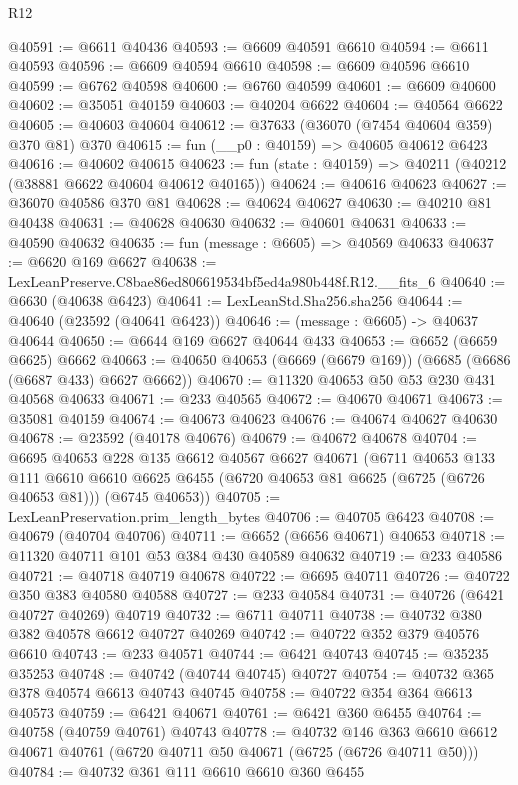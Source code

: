 \begin{lexlean}{R12}
\begin{coremodule}
@40591 := @6611 @40436
@40593 := @6609 @40591 @6610
@40594 := @6611 @40593
@40596 := @6609 @40594 @6610
@40598 := @6609 @40596 @6610
@40599 := @6762 @40598
@40600 := @6760 @40599
@40601 := @6609 @40600
@40602 := @35051 @40159
@40603 := @40204 @6622
@40604 := @40564 @6622
@40605 := @40603 @40604
@40612 := @37633 (@36070 (@7454 @40604 @359) @370 @81) @370
@40615 := fun (__p0 : @40159) => @40605 @40612 @6423
@40616 := @40602 @40615
@40623 := fun (state : @40159) => @40211 (@40212 (@38881 @6622 @40604 @40612 @40165))
@40624 := @40616 @40623
@40627 := @36070 @40586 @370 @81
@40628 := @40624 @40627
@40630 := @40210 @81 @40438
@40631 := @40628 @40630
@40632 := @40601 @40631
@40633 := @40590 @40632
@40635 := fun (message : @6605) => @40569 @40633
@40637 := @6620 @169 @6627
@40638 := LexLeanPreserve.C8bae86ed806619534bf5ed4a980b448f.R12.__fits_6
@40640 := @6630 (@40638 @6423)
@40641 := LexLeanStd.Sha256.sha256
@40644 := @40640 (@23592 (@40641 @6423))
@40646 := (message : @6605) -> @40637 @40644
@40650 := @6644 @169 @6627 @40644 @433
@40653 := @6652 (@6659 @6625) @6662
@40663 := @40650 @40653 (@6669 (@6679 @169)) (@6685 (@6686 (@6687 @433) @6627 @6662))
@40670 := @11320 @40653 @50 @53 @230 @431 @40568 @40633
@40671 := @233 @40565
@40672 := @40670 @40671
@40673 := @35081 @40159
@40674 := @40673 @40623
@40676 := @40674 @40627 @40630
@40678 := @23592 (@40178 @40676)
@40679 := @40672 @40678
@40704 := @6695
    @40653
    @228
    @135
    @6612
    @40567
    @6627
    @40671
    (@6711
      @40653
      @133
      @111
      @6610
      @6610
      @6625
      @6455
      (@6720 @40653 @81 @6625 (@6725 (@6726 @40653 @81)))
      (@6745 @40653))
@40705 := LexLeanPreservation.prim_length_bytes
@40706 := @40705 @6423
@40708 := @40679 (@40704 @40706)
@40711 := @6652 (@6656 @40671) @40653
@40718 := @11320 @40711 @101 @53 @384 @430 @40589 @40632
@40719 := @233 @40586
@40721 := @40718 @40719 @40678
@40722 := @6695 @40711
@40726 := @40722 @350 @383 @40580 @40588
@40727 := @233 @40584
@40731 := @40726 (@6421 @40727 @40269) @40719
@40732 := @6711 @40711
@40738 := @40732 @380 @382 @40578 @6612 @40727 @40269
@40742 := @40722 @352 @379 @40576 @6610
@40743 := @233 @40571
@40744 := @6421 @40743
@40745 := @35235 @35253
@40748 := @40742 (@40744 @40745) @40727
@40754 := @40732 @365 @378 @40574 @6613 @40743 @40745
@40758 := @40722 @354 @364 @6613 @40573
@40759 := @6421 @40671
@40761 := @6421 @360 @6455
@40764 := @40758 (@40759 @40761) @40743
@40778 := @40732
    @146
    @363
    @6610
    @6612
    @40671
    @40761
    (@6720 @40711 @50 @40671 (@6725 (@6726 @40711 @50)))
@40784 := @40732 @361 @111 @6610 @6610 @360 @6455

\end{coremodule}
\end{lexlean}
